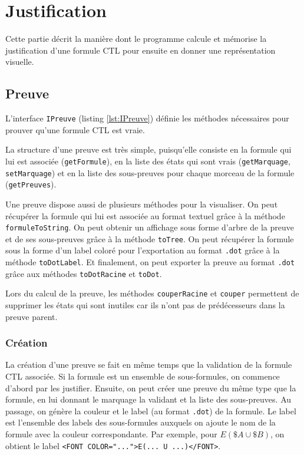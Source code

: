 \documentclass[dvipsnames]{report}
\begin{document}
\section{Justification}

Cette partie décrit la manière dont le programme calcule et mémorise la justification d'une formule CTL pour ensuite en donner une représentation visuelle.

\subsection{Preuve}

L'interface \texttt{IPreuve} (listing \ref{lst:IPreuve}) définie les méthodes nécessaires pour prouver qu'une formule CTL est vraie. 

La structure d'une preuve est très simple, puisqu'elle consiste en la formule qui lui est associée (\texttt{getFormule}), en la liste des états qui sont vrais (\texttt{getMarquage}, \texttt{setMarquage}) et en la liste des sous-preuves pour chaque morceau de la formule (\texttt{getPreuves}).

Une preuve dispose aussi de plusieurs méthodes pour la visualiser. On peut récupérer la formule qui lui est associée au format textuel grâce à la méthode \texttt{formuleToString}. On peut obtenir un affichage sous forme d'arbre de la preuve et de ses sous-preuves grâce à la méthode \texttt{toTree}. On peut récupérer la formule sous la forme d'un label coloré pour l'exportation au format \texttt{.dot} grâce à la méthode \texttt{toDotLabel}. Et finalement, on peut exporter la preuve au format \texttt{.dot} grâce aux méthodes \texttt{toDotRacine} et \texttt{toDot}.

Lors du calcul de la preuve, les méthodes \texttt{couperRacine} et \texttt{couper} permettent de supprimer les états qui sont inutiles car ils n'ont pas de prédécesseurs dans la preuve parent.

\subsubsection{Création}

La création d'une preuve se fait en même temps que la validation de la formule CTL associée. Si la formule est un ensemble de sous-formules, on commence d'abord par les justifier. Ensuite, on peut créer une preuve du même type que la formule, en lui donnant le marquage la validant et la liste des sous-preuves. Au passage, on génère la couleur et le label (au format \texttt{.dot}) de la formule. Le label est l'ensemble des labels des sous-formules auxquels on ajoute le nom de la formule avec la couleur correspondante. Par exemple, pour $E(\$A \cup \$B)$, on obtient le label \texttt{<FONT COLOR="...">E(... U ...)</FONT>}.
\end{document}
